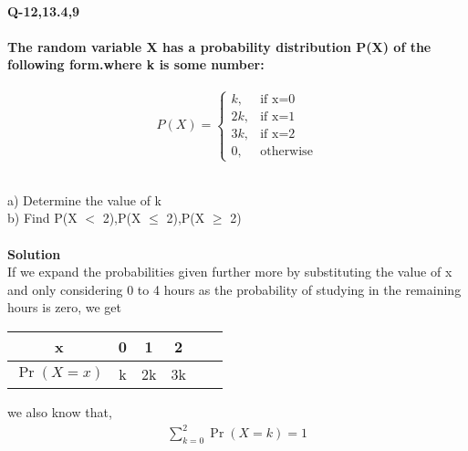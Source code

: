 \documentclass[10pt, a4paper]{article}
\title{\mytitle}
\author{\myauthor\hspace{1em} \\\contact\\FWC22094\hspace{6.5em}IITH\hspace{0.5em}\mymodule\hspace{6em}Module 2}
\date{}
\providecommand{\brak}[1]{\ensuremath{\left(#1\right)}}
\begin{document}
\maketitle
\paragraph*{\large Q-12,13.4,9}
\paragraph*{\large The random variable X has a probability distribution P(X) of the following form.where k is some number: }
\begin{equation}
  P(X) =
    \begin{cases}
      k,  & \text{if x=0}\\
      2k, & \text{if x=1}\\
      3k, & \text{if x=2}\\
      0 , & \text{otherwise}
    \end{cases}       
\end{equation}

\hspace{15mm}\\
a) Determine the value of k
\\
b) Find P(X $<$ 2),P(X $\leq$ 2),P(X $\geq$ 2)
\\
\\
\textbf{Solution}\\
If we expand the probabilities given further more
by substituting the value of x and only considering
0 to 4 hours as the probability of studying in the
remaining hours is zero, we get\\
\begin{center}
\begin{tabular}{|c|c|c|c|c|c|}
    \hline
    x &  0 & 1 & 2 \\
    \hline
    $\Pr\brak{X=x}$ & k & 2k & 3k\\
    \hline  
\end{tabular}
\end{center}

we also know that,
\begin{align}
    \sum_{k = 0}^2 \Pr\brak{X = k} = 1 \label{eq 2.0.1}
\end{align}
\end{document}
